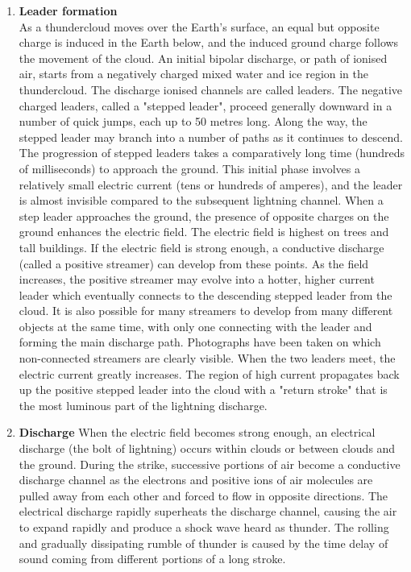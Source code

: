 {\begin {enumerate}
\item \textbf{Leader formation}\\
As a thundercloud moves over the Earth's surface, an equal but opposite charge
is induced in the Earth below, and the induced ground charge follows the
movement of the cloud.
An initial bipolar discharge, or path of ionised air, starts from a negatively
charged mixed water and ice region in the thundercloud. The discharge ionised
channels are called leaders. The negative charged leaders, called a "stepped
leader", proceed generally downward in a number of quick jumps, each up to 50
metres long. Along the way, the stepped leader may branch into a number of paths
as it continues to descend. The progression of stepped leaders takes a
comparatively long time (hundreds of milliseconds) to approach the ground. This
initial phase involves a relatively small electric current (tens or hundreds of
amperes), and the leader is almost invisible compared to the subsequent
lightning channel.
When a step leader approaches the ground, the presence of opposite charges on
the ground enhances the electric field. The electric field is highest on trees
and tall buildings. If the electric field is strong enough, a conductive
discharge (called a positive streamer) can develop from these points. As the
field increases, the positive streamer may evolve into a hotter, higher current
leader which eventually connects to the descending stepped leader from the
cloud. It is also possible for many streamers to develop from many different
objects at the same time, with only one connecting with the leader and forming the
main discharge path. Photographs have been taken on which non-connected
streamers are clearly visible. When the two leaders meet, the electric current
greatly increases. The region of high current propagates back up the positive
stepped leader into the cloud with a "return stroke" that is the most luminous
part of the lightning discharge.\\
\item \textbf{Discharge}
When the electric field becomes strong enough, an electrical discharge (the bolt
of lightning) occurs within clouds or between clouds and the ground. During the
strike, successive portions of air become a conductive discharge channel as the
electrons and positive ions of air molecules are pulled away from each other and
forced to flow in opposite directions.
The electrical discharge rapidly superheats the discharge channel, causing the
air to expand rapidly and produce a shock wave heard as thunder. The rolling and
gradually dissipating rumble of thunder is caused by the time delay of sound
coming from different portions of a long stroke.
\end{enumerate}}

